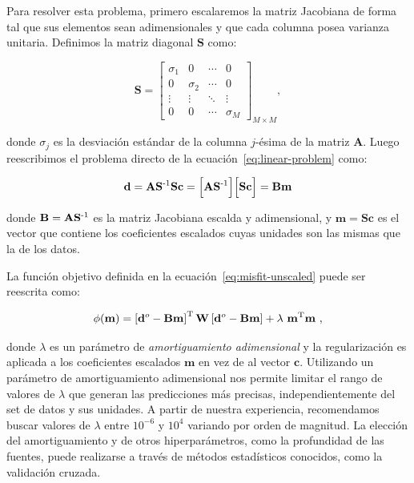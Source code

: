 Para resolver esta problema, primero escalaremos la matriz Jacobiana de forma
tal que sus elementos sean adimensionales y que cada columna posea varianza
unitaria.
Definimos la matriz diagonal $\mathbf{S}$ como:

\begin{equation}
    \mathbf{S} =
    \begin{bmatrix}
      \sigma_1 & 0 & \cdots &0 \\
      0 & \sigma_2 & \cdots &0 \\
      \vdots & \vdots & \ddots & \vdots \\
      0  & 0 & \cdots & \sigma_M
    \end{bmatrix}_{M \times M}
    ,
\end{equation}

\noindent donde $\sigma_j$ es la desviación estándar de la columna $j$-ésima
de la matriz $\mathbf{A}$.
Luego reescribimos el problema directo de la ecuación~\ref{eq:linear-problem}
como:

\begin{equation}
    \mathbf{d}
    =
    \mathbf{A} \mathbf{S}^{\text{-}1} \mathbf{S} \mathbf{c}
    =
    \Big[
        \mathbf{A} \mathbf{S}^{\text{-}1}
    \Big]
    \Big[
        \mathbf{S} \mathbf{c}
    \Big]
    =
    \mathbf{B} \mathbf{m}
\end{equation}

\noindent donde $\mathbf{B} = \mathbf{A} \mathbf{S}^{\text{-}1}$ es la matriz Jacobiana
escalda y adimensional, y
$\mathbf{m} = \mathbf{S} \mathbf{c}$ es el vector que contiene los coeficientes
escalados cuyas unidades son las mismas que la de los datos.

La función objetivo definida en la ecuación~\ref{eq:misfit-unscaled} puede ser
reescrita como:

\begin{equation}
    \phi(\mathbf{m}) =
    \left[\mathbf{d}^o - \mathbf{B}\mathbf{m}\right]^{\text{T}}
    \mathbf{W}
    \left[\mathbf{d}^o - \mathbf{B}\mathbf{m}\right]
    + \lambda\ \mathbf{m}^{\text{T}}\mathbf{m}
    \ ,
    \label{eq:misfit}
\end{equation}

\noindent donde $\lambda$ es un parámetro de \emph{amortiguamiento
adimensional} y la regularización es aplicada a los coeficientes escalados
$\mathbf{m}$ en vez de al vector $\mathbf{c}$.
Utilizando un parámetro de amortiguamiento adimensional nos permite limitar el
rango de valores de $\lambda$ que generan las predicciones más precisas,
independientemente del set de datos y sus unidades.
A partir de nuestra experiencia, recomendamos buscar valores de $\lambda$ entre
$10^{-6}$ y $10^{4}$ variando por orden de magnitud.
La elección del amortiguamiento y de otros hiperparámetros, como la profundidad
de las fuentes, puede realizarse a través de métodos estadísticos conocidos,
como la validación cruzada.

